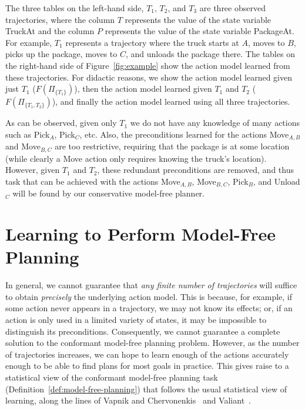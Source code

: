 \documentclass{article}
\begin{document}
	
	
	The three tables on the left-hand side, $T_1$, $T_2$, and $T_3$ are three observed trajectories, where the column $T$ represents the value of the state variable TruckAt and the column $P$ represents the value of the state variable PackageAt. For example, $T_1$ represents a trajectory where the truck starts at $A$, moves to $B$, picks up the package, moves to $C$, and unloads the package there. 	The tables on the right-hand side of Figure~\ref{fig:example} show the action model learned from these trajectories. For didactic reasons, we show the action model learned given just $T_1$ ($F(\Pi_{\{T_1\}})$), 
	then the action model learned given $T_1$ and $T_2$ ($F(\Pi_{\{T_1, T_2\}})$), and finally 
	the action model learned using all three trajectories. 
	
	
	As can be observed, given only $T_1$ we do not have any knowledge of many actions such as Pick$_A$, Pick$_C$, etc. Also, the preconditions learned for the actions Move$_{A,B}$ 
	and Move$_{B,C}$ are too restrictive, requiring that the package is at some location (while clearly a Move action only requires knowing the truck's location). However, given $T_1$ and $T_2$, these redundant preconditions are removed, and thus task that can be achieved with the actions Move$_{A,B}$, Move$_{B,C}$, Pick$_B$, and Unload$_C$ will be found by our conservative model-free planner. 
	
	
	
	\section{Learning to Perform Model-Free Planning}
	In general, we cannot guarantee that {\em any finite number of trajectories} will suffice to obtain {\em precisely} the underlying action model. This is because, for example, if some action never appears in a trajectory, we may not know its effects; or, if an action is only used in a limited variety of states, it may be impossible to distinguish its preconditions. Consequently, we cannot guarantee a complete solution to the conformant model-free planning problem. However, as the number of trajectories increases, we can hope to learn enough of the actions accurately enough to be able to find plans for most goals in practice. This gives raise to a statistical view of the conformant model-free planning task (Definition~\ref{def:model-free-planning}) that follows the usual statistical view of learning, along the lines of Vapnik and Chervonenkis~ and Valiant~.  %
	
\end{document}
